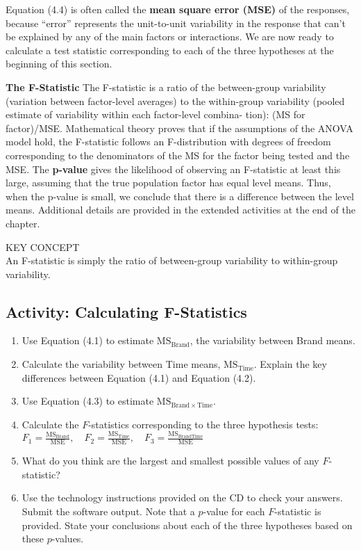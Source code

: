 \documentclass[
]{report}
\begin{document}
Equation (4.4) is often called the \textbf{mean square error (MSE)} of the responses, because ``error'' represents the
unit-to-unit variability in the response that can't be explained by any of the main factors or interactions. We are
now ready to calculate a test statistic corresponding to each of the three hypotheses at the beginning of this section.

\textbf{The F-Statistic} The F-statistic is a ratio of the between-group variability (variation between factor-level
averages) to the within-group variability (pooled estimate of variability within each factor-level combina-
tion): (MS for factor)/MSE. Mathematical theory proves that if the assumptions of the ANOVA model hold,
the F-statistic follows an F-distribution with degrees of freedom corresponding to the denominators of the
MS for the factor being tested and the MSE. The \textbf{p-value} gives the likelihood of observing an F-statistic at
least this large, assuming that the true population factor has equal level means. Thus, when the p-value is
small, we conclude that there is a difference between the level means. Additional details are provided in the
extended activities at the end of the chapter.

KEY CONCEPT\\
An F-statistic is simply the ratio of between-group variability to within-group variability.

\subsection{Activity: Calculating F-Statistics}\label{activity-calculating-f-statistics}

\begin{enumerate}
\def\labelenumi{\arabic{enumi}.}
\setcounter{enumi}{7}
\item
  Use Equation (4.1) to estimate \(\mathrm{MS}_{\mathrm{Brand}}\), the variability between Brand means.
\item
  Calculate the variability between Time means, \(\mathrm{MS}_{\mathrm{Time}}\). Explain the key differences between Equation (4.1) and Equation (4.2).
\item
  Use Equation (4.3) to estimate \(\mathrm{MS}_{\mathrm{Brand}\times\mathrm{Time}}\).
\item
  Calculate the \(F\)-statistics corresponding to the three hypothesis tests:
  \(F_1 = \frac{\mathrm{MS}_{\mathrm{Brand}}}{\mathrm{MSE}},\quad F_2 = \frac{\mathrm{MS}_{\mathrm{Time}}}{\mathrm{MSE}},\quad F_3=\frac{\mathrm{MS}_{\mathrm{BrandTime}}}{\mathrm{MSE}}\)
\item
  What do you think are the largest and smallest possible values of any \(F\)-statistic?
\item
  Use the technology instructions provided on the CD to check your answers. Submit the software output. Note that a \(p\)-value for each \(F\)-statistic is provided. State your conclusions about each of the three hypotheses based on these \(p\)-values.
\end{enumerate}
\end{document}
